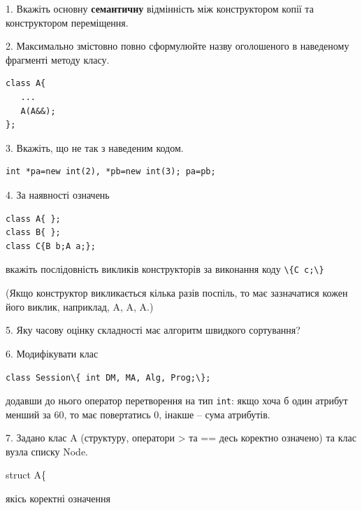 \documentclass[12pt, ukrainian]{article}
\def\code#1{\Verb!#1!}
\begin{document}
{%
1. Вкажіть основну \textbf{семантичну} відмінність між конструктором копії та конструктором переміщення.%
\par
\vspace{2mm}
2. Максимально змістовно повно сформулюйте назву оголошеного в наведеному фрагменті методу класу.
\vspace{-3mm}
\begin{verbatim}class A{
   ...
   A(A&&);
};\end{verbatim}
\vspace{-3mm}
\par
\vspace{2mm}
3. Вкажіть, що не так з наведеним кодом.
\vspace{-3mm}
\begin{verbatim}int *pa=new int(2), *pb=new int(3); pa=pb;\end{verbatim}
\vspace{-3mm}
\par
\vspace{2mm}
4. За наявності означень
\vspace{-3mm}
\begin{verbatim}
class A{ };
class B{ };
class C{B b;A a;};\end{verbatim}
\vspace{-3mm}
вкажіть послідовність викликів конструкторів за виконання коду \code{\{C c;\}} 

(Якщо конструктор викликається кілька разів поспіль, то має зазначатися кожен його виклик, наприклад, A, A, A.)

\vspace{2mm}
5. Яку часову оцінку складності має алгоритм швидкого сортування?
\par
\vspace{2mm}
6. Модифікувати клас 

\qquad\code{class Session\{ int DM, MA, Alg, Prog;\};} 


додавши до нього оператор перетворення на тип \code{int}: якщо хоча б один атрибут менший за 60, то має повертатись 0, інакше -- сума атрибутів.%
\par
\vspace{2mm}
7. 
Задано клас A (структуру, оператори > та == десь коректно означено) та клас вузла списку Node.

struct A\{

\quad  якісь коректні означення 

}
\end{document}
